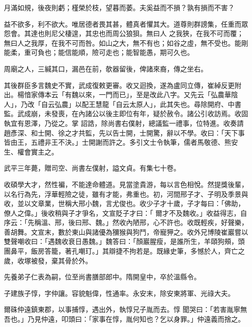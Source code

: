 \begin{pinyinscope}
 月滿如規，後夜則虧；槿榮於枝，望暮而萎。夫奚益而不損？孰有損而不害？



 益不欲多，利不欲大。唯居德者畏其甚，體真者懼其大。道尊則群謗集，任重而眾怨會。其達也則尼父棲遑，其忠也而周公狼狽。無曰人
 之我狹，在我不可而覆；無曰人之我厚，在我不可而咎。如山之大，無不有也；如谷之虛，無不受也。能剛能柔，重可負也；能信能順，險可走也；能智能愚，期可久也。



 周廟之人，三緘其口，漏邑在前，欹器留後，俾諸來裔，傳之坐右。



 其後群臣多言魏史不實，武成復敕更審。收又迴換，遂為盧同立傳，崔綽反更附出。楊愔家傳本云「有魏以來，一門而已」，至是改此八字。又先云「弘農華陰人」，乃改「自云弘農」以配王慧龍「自云太原人」，此其失也。尋除開府、中書監。武成崩，未發喪，在內諸公以後主即位有年，疑於赦令。諸公引收訪焉。收固執宜有恩澤，乃從之。掌
 詔誥，除尚書右僕射，總議監一禮事，位特進。收奏請趙彥深、和士開、徐之才共監，先以告士開，士開驚，辭以不學。收曰：「天下事皆由王，五禮非王不決。」士開謝而許之。多引文士令執筆，儒者馬敬德、熊安生、權會實主之。



 武平三年薨，贈司空、尚書左僕射，謚文貞。有集七十卷。



 收碩學大才，然性褊，不能達命體道。見當塗貴游，每以言色相悅。然提獎後輩，以名行為先，浮華輕險之徒，雖有才能，弗重也。初，河間邢子才、子明及季景與收，並以文章業，世稱大邢小魏，言尤俊也。收少子才十歲，子才每曰：「佛助，僚人之偉。」後收稍與子才爭名，文宣貶子才曰：「
 爾才不及魏收。」收益得志，自序云：「先稱溫、邢，後曰邢、魏。」然收內陋邢，心不許也。收既輕疾，好聲樂，善胡舞。文宣末，數於東山與諸優為獼猴與狗鬥，帝寵狎之。收外兄博陵崔巖嘗以雙聲嘲收曰：「遇魏收衰日愚魏。」魏答曰：「顏巖腥瘦，是誰所生，羊頤狗頰，頭團鼻平，飯房答籠，著孔嘲玎。」其辯捷不拘若是。既緣史筆，多憾於人，齊亡之歲，收塚被發，棄其骨於外。



 先養弟子仁表為嗣，位至尚書膳部郎中。隋開皇中，卒於溫縣令。



 子建族子惇，字仲讓。容貌魁偉，性通率。永安末，除安東將軍、光祿大夫。



 爾硃仲遠鎮東郡，以事捕惇，遇出外，執惇兄子胤而去。惇
 聞哭曰：「若害胤寧無吾也。」乃見仲遠，叩頭曰：「家事在惇，胤何知也？乞以身罪。」仲遠義而捨之。




\end{pinyinscope}
